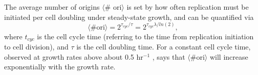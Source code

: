The average number of origins $\langle$\# ori$\rangle$ is set by how often
replication must be initiated per cell doubling under steady-state growth,
and can be quantified via
\begin{equation}
    \langle \text{\# ori} \rangle = 2^{\tau_{cyc} / \tau} = 2^{\tau_{cyc} \lambda / ln(2)},
    \label{eq:Nori}
\end{equation}
where $t_{cyc}$ is the cell cycle time (referring to the time from replication
initiation to cell division), and $\tau$ is the cell doubling time. For a
constant cell cycle time, observed at growth rates above about 0.5 hr$^{-1}$
\citep{helmstetter1968},  says that $\langle \text{\# ori} \rangle$ will increase
exponentially with the growth rate.








